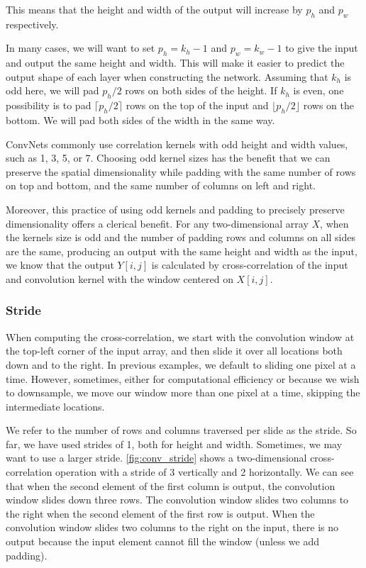 This means that the height and width of the output will increase by  $p_h$  and  $p_w$  respectively.

In many cases, we will want to set  $p_h=k_h-1$  and  $p_w=k_w-1$  to give the input and output the same height and width. This will make it easier to predict the output shape of each layer when constructing the network. Assuming that  $k_h$  is odd here, we will pad  $p_h/2$ rows on both sides of the height. If $k_h$  is even, one possibility is to pad  $\lceil p_h/2\rceil$  rows on the top of the input and  $\lfloor p_h/2\rfloor$  rows on the bottom. We will pad both sides of the width in the same way.

ConvNets commonly use correlation kernels with odd height and width values, such as 1, 3, 5, or 7. Choosing odd kernel sizes has the benefit that we can preserve the spatial dimensionality while padding with the same number of rows on top and bottom, and the same number of columns on left and right.

Moreover, this practice of using odd kernels and padding to precisely preserve dimensionality offers a clerical benefit. For any two-dimensional array $X$, when the kernels size is odd and the number of padding rows and columns on all sides are the same, producing an output with the same height and width as the input, we know that the output $Y[i,j]$ is calculated by cross-correlation of the input and convolution kernel with the window centered on $X[i,j]$.

\subsubsection{Stride}

When computing the cross-correlation, we start with the convolution window at the top-left corner of the input array, and then slide it over all locations both down and to the right. In previous examples, we default to sliding one pixel at a time. However, sometimes, either for computational efficiency or because we wish to downsample, we move our window more than one pixel at a time, skipping the intermediate locations.

We refer to the number of rows and columns traversed per slide as the stride. So far, we have used strides of 1, both for height and width. Sometimes, we may want to use a larger stride. \cref{fig:conv_stride} shows a two-dimensional cross-correlation operation with a stride of 3 vertically and 2 horizontally. We can see that when the second element of the first column is output, the convolution window slides down three rows. The convolution window slides two columns to the right when the second element of the first row is output. When the convolution window slides two columns to the right on the input, there is no output because the input element cannot fill the window (unless we add padding).

